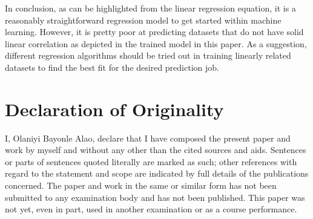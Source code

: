 \documentclass[conference]{IEEEtran}
\begin{document}
In conclusion, as can be highlighted from the linear regression equation, it is a reasonably straightforward regression model to get started within machine learning. However, it is pretty poor at predicting datasets that do not have solid linear correlation as depicted in the trained model in this paper. As a suggestion, different regression algorithms should be tried out in training linearly related datasets to find the best fit for the desired prediction job.

\section{Declaration of Originality}
I, Olaniyi Bayonle Alao, declare that I have composed the present paper and work by myself and without any other than the cited sources and aids. Sentences or parts of sentences quoted literally are marked as such; other references with regard to the statement and scope are indicated by full details of the publications concerned. The paper and work in the same or similar form has not been submitted to any examination body and has not been published. This paper was not yet, even in part, used in another examination or as a course performance.



\end{document}
